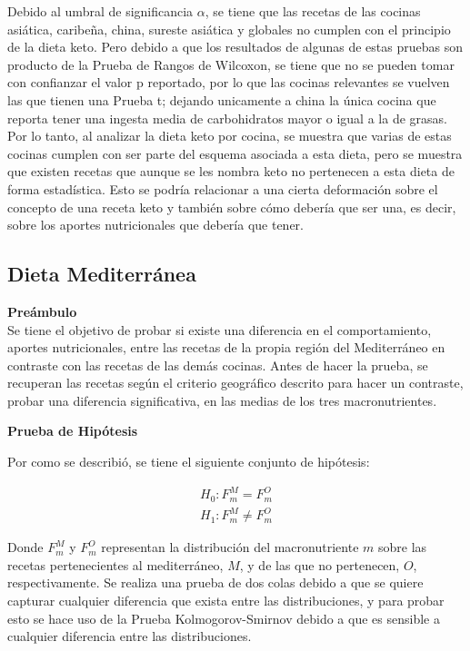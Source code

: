 \documentclass[12pt,a4paper]{article}
\begin{document}
{            Debido al umbral de significancia $\alpha$, se tiene que las recetas de las cocinas 
            asiática, caribeña, china, sureste asiática y globales no cumplen con el principio de la 
            dieta keto. Pero debido a que los resultados de algunas de estas pruebas son producto 
            de la  Prueba de Rangos de Wilcoxon, se tiene que no se pueden tomar con confianzar el 
            valor p reportado, por lo que las cocinas relevantes se vuelven las que tienen una Prueba 
            t; dejando unicamente a china la única cocina que reporta tener una ingesta media de carbohidratos 
            mayor o igual a la de grasas. 
            Por lo tanto, al analizar la dieta keto por cocina, se muestra que varias de estas cocinas  
            cumplen con ser parte del esquema asociada a esta dieta, pero se muestra que existen recetas 
            que aunque se les nombra keto no pertenecen a esta dieta de forma estadística. Esto se podría 
            relacionar a una cierta deformación sobre el concepto de una receta keto y también sobre 
            cómo debería que ser una, es decir, sobre los aportes nutricionales que debería que tener.
        }
    
    \subsection{Dieta Mediterránea}
        \textbf{Preámbulo}\\
        {
            Se tiene el objetivo de probar si existe una diferencia en el comportamiento, aportes 
            nutricionales, entre las recetas de la propia región del Mediterráneo en contraste 
            con las recetas de las demás cocinas. 
            Antes de hacer la prueba, se recuperan las recetas según el criterio geográfico 
            descrito para hacer un contraste, probar una diferencia significativa, en las medias 
            de los tres macronutrientes.\\
        }

        \textbf{Prueba de Hipótesis}\\
        {
            Por como se describió, se tiene el siguiente conjunto de hipótesis:

            \begin{align*}
                H_0 : F^M_m = F^O_m \\
                H_1 : F^M_m \ne F^O_m  
            \end{align*}

            Donde $F^M_m$ y $F^O_m$ representan la distribución del macronutriente $m$ sobre las 
            recetas pertenecientes al mediterráneo, $M$, y de las que no pertenecen, $O$, respectivamente. 
            Se realiza una prueba de dos colas debido a que se quiere capturar cualquier diferencia 
            que exista entre las distribuciones,  y para probar esto se hace uso de la Prueba Kolmogorov-Smirnov 
            debido a que es sensible a cualquier diferencia entre las distribuciones.\\
        }
\end{document}
